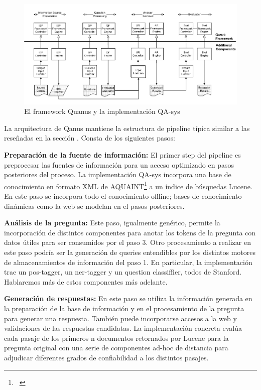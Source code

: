\begin{figure}
  \centering
    \includegraphics{graficos/Quanus}
  \caption{El framework Quanus y la implementación QA-sys}
  \label{fig:Quanus}
\end{figure}


La arquitectura de Qanus mantiene la estructura de pipeline típica similar a las reseñadas en la sección . 
Consta de los siguientes pasos:

\textbf{Preparación de la fuente de información: } El primer step del pipeline es preprocesar las fuentes de información para un acceso optimizado en pasos posteriores del proceso. La implementación QA-sys incorpora una base de conocimiento en formato XML de AQUAINT\footnote{\ } a un índice de
búsquedas Lucene. En este paso se incorpora todo el conocimiento offline; bases de conocimiento dinámicas como la web se modelan en el pasos posteriores. \newline

\textbf{Análisis de la pregunta: } Este paso, igualmente genérico, permite la incorporación de
distintos componentes para anotar los tokens de la pregunta con datos
útiles para ser consumidos por el paso 3. Otro procesamiento a
realizar en este paso podría ser la generación de queries
entendibles por los distintos motores de almacenamientos de
información del paso 1. En particular, la implementación trae un
pos-tagger, un ner-tagger y un question classiffier, todos de Stanford.
Hablaremos más de estos componentes más adelante. \newline

\textbf{Generación de respuestas: } En este paso se utiliza la información generada en la preparación
de la base de información y en el procesamiento de la pregunta para
generar una respuesta. También puede incorporarse accesos a la web y
validaciones de las respuestas candidatas. La implementación concreta
evalúa cada pasaje de los primeros n documentos retornados por Lucene
para la pregunta original con una serie de componentes ad-hoc de
distancia para adjudicar diferentes grados de confiabilidad a los
distintos pasajes. \newline



